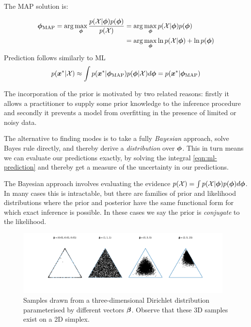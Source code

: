 The MAP solution is:

\begin{align}
{ { {  \bm \phi  } }_{\text{MAP}} } = \arg \max_{{ \bm \phi }} \frac{p({ \mathcal{X} } | { \bm \phi })p({ \bm \phi })}{p({ \mathcal{X} })}
 & = \arg \max_{{ \bm \phi }} p({ \mathcal{X} } | { \bm \phi })p({ \bm \phi }) \\
 & = \arg \max_{ \bm \phi } \ln p({ \mathcal{X} } | { \bm \phi }) + \ln p({ \bm \phi })
\end{align}
Prediction follows similarly to ML
\begin{align}
p({ \bm x^{*} } | { \mathcal{X} }) \approx \int p({ \bm x^{*} } | { {{ \bm \phi }}_{\text{MAP}} })p({ \bm \phi }|{ \mathcal{X} })d{ \bm \phi } = p({ \bm x^{*} } | { {{ \bm \phi }}_{\text{MAP}} })
\end{align}



The incorporation of the prior is motivated by two related reasons: firstly it allows a practitioner to supply some prior knowledge to the inference procedure and secondly it prevents a model from overfitting in the presence of limited or noisy data.

The alternative to finding modes is to take a fully \emph{Bayesian} approach, solve Bayes rule directly, and thereby derive a \emph{distribution} over ${ \bm \phi }$. This in turn means we can evaluate our predictions exactly, by solving the integral \eqref{eqn:ml-prediction} and thereby get a measure of the uncertainty in our predictions.

The Bayesian approach involves evaluating the evidence $p({ \mathcal{X} }) = \int p({ \mathcal{X} } | { \bm \phi }) p({ \bm \phi }) d{ \bm \phi }$. In many cases this is intractable, but there are families of prior and likelihood distributions where the prior and posterior have the same functional form for which exact inference is possible. In these cases we say the prior is \emph{conjugate} to the likelihood.

\begin{figure}
  \centering
    \includegraphics[width=0.97\textwidth]{../Chap1/plots/dirichlet_samples.pdf}
  \caption{Samples drawn from a three-dimensional Dirichlet distribution parameterised by different vectors $\bm \beta$. Observe that these 3D samples exist on a 2D simplex.}
  \label{fig:dirichlet-params}
\end{figure}

